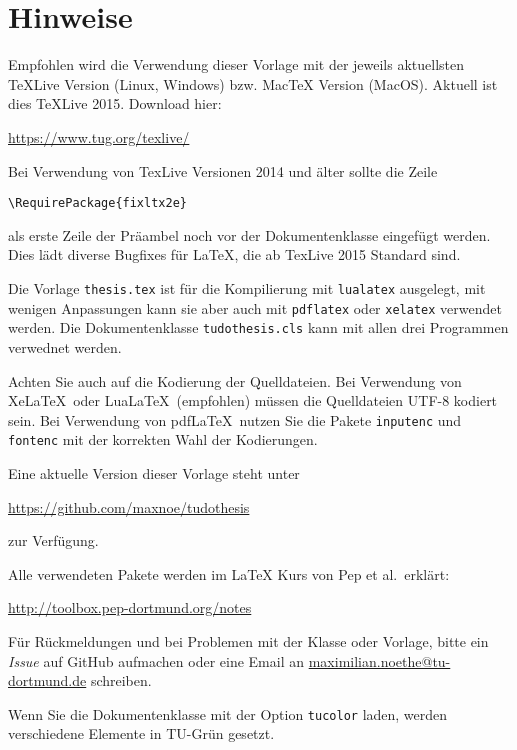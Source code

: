 \thispagestyle{empty}
\setcounter{page}{2}
\section*{Hinweise}
Empfohlen wird die Verwendung dieser Vorlage mit der jeweils aktuellsten TeXLive Version (Linux, Windows) bzw. MacTeX Version (MacOS).
Aktuell ist dies TeXLive 2015. Download hier:
\begin{center}
  \ttfamily\url{https://www.tug.org/texlive/}
\end{center}
Bei Verwendung von TexLive Versionen 2014 und älter sollte
die Zeile
\begin{center}
\verb+\RequirePackage{fixltx2e}+ 
\end{center}
als erste Zeile der Präambel noch vor der Dokumentenklasse eingefügt werden.
Dies lädt diverse Bugfixes für LaTeX, die ab TexLive 2015 Standard sind.

Die Vorlage \texttt{thesis.tex} ist für die Kompilierung mit \texttt{lualatex} ausgelegt, mit wenigen Anpassungen kann sie aber auch mit \texttt{pdflatex} oder \texttt{xelatex} verwendet werden. 
Die Dokumentenklasse \texttt{tudothesis.cls} kann mit allen drei Programmen verwednet werden.

Achten Sie auch auf die Kodierung der Quelldateien.
Bei Verwendung von Xe\LaTeX\ oder Lua\LaTeX\ (empfohlen) müssen die
Quelldateien UTF-8 kodiert sein.
Bei Verwendung von pdf\LaTeX\ nutzen Sie die Pakete \texttt{inputenc} und \texttt{fontenc} mit der korrekten Wahl der Kodierungen.

Eine aktuelle Version dieser Vorlage steht unter 
\begin{center}
  \ttfamily\url{https://github.com/maxnoe/tudothesis}
\end{center}
zur Verfügung.

Alle verwendeten Pakete werden im \LaTeX{} Kurs von Pep et al.\ erklärt:
\begin{center}
  \ttfamily\url{http://toolbox.pep-dortmund.org/notes}
\end{center}

Für Rückmeldungen und bei Problemen mit der Klasse oder Vorlage, bitte ein \emph{Issue} auf GitHub aufmachen oder eine Email an
\href{mailto:maximilian.noethe@tu-dortmund.de}{maximilian.noethe@tu-dortmund.de} schreiben.

Wenn Sie die Dokumentenklasse mit der Option \texttt{tucolor} laden, werden verschiedene Elemente in TU-Grün gesetzt.
